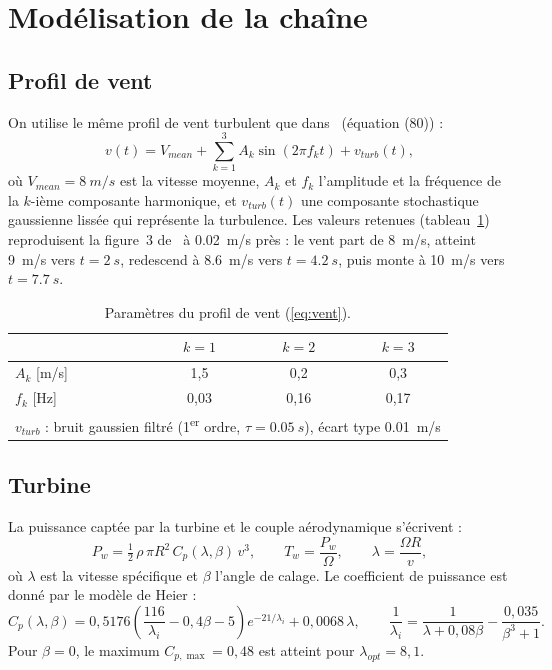 \documentclass[11pt,a4paper]{article}
\theoremstyle{remark}
\begin{document}
\section{Modélisation de la chaîne}

\subsection{Profil de vent}
On utilise le même profil de vent turbulent que dans~\cite{regani} (équation (80)) :
\begin{equation}
  v(t) = V_{mean} + \sum_{k=1}^{3} A_k \sin(2\pi f_k t) + v_{turb}(t),
  \label{eq:vent}
\end{equation}
où $V_{mean}=\SI{8}{m/s}$ est la vitesse moyenne, $A_k$ et $f_k$ l'amplitude et la fréquence de la
$k$-ième composante harmonique, et $v_{turb}(t)$ une composante stochastique gaussienne lissée qui
représente la turbulence. Les valeurs retenues (tableau~\ref{tab:vent}) reproduisent la figure~3
de~\cite{regani} à \SI{0,02}{m/s} près : le vent part de \SI{8}{m/s}, atteint \SI{9}{m/s} vers
$t=\SI{2}{s}$, redescend à \SI{8,6}{m/s} vers $t=\SI{4,2}{s}$, puis monte à \SI{10}{m/s} vers
$t=\SI{7,7}{s}$.

\begin{table}[h]
\centering
\caption{Paramètres du profil de vent (\ref{eq:vent}).}
\label{tab:vent}
\begin{tabular}{lccc}
\toprule
& $k=1$ & $k=2$ & $k=3$\\
\midrule
$A_k$ [\si{m/s}] & 1,5 & 0,2 & 0,3\\
$f_k$ [\si{Hz}] & 0,03 & 0,16 & 0,17\\
\midrule
\multicolumn{4}{l}{$v_{turb}$ : bruit gaussien filtré (1\textsuperscript{er} ordre, $\tau=\SI{0,05}{s}$),
écart type \SI{0,01}{m/s}}\\
\bottomrule
\end{tabular}
\end{table}

\subsection{Turbine}
La puissance captée par la turbine et le couple aérodynamique s'écrivent :
\begin{equation}
  P_w = \tfrac12\,\rho\,\pi R^2\,C_p(\lambda,\beta)\,v^3, \qquad
  T_w = \frac{P_w}{\Omega}, \qquad
  \lambda = \frac{\Omega R}{v},
  \label{eq:turbine}
\end{equation}
où $\lambda$ est la vitesse spécifique et $\beta$ l'angle de calage. Le coefficient de puissance
est donné par le modèle de Heier :
\begin{equation}
  C_p(\lambda,\beta) = 0{,}5176\left(\frac{116}{\lambda_i} - 0{,}4\beta - 5\right)e^{-21/\lambda_i}
  + 0{,}0068\,\lambda,
  \qquad
  \frac{1}{\lambda_i} = \frac{1}{\lambda+0{,}08\beta} - \frac{0{,}035}{\beta^3+1}.
\end{equation}
Pour $\beta=0$, le maximum $C_{p,\max}=0{,}48$ est atteint pour $\lambda_{opt}=8{,}1$.
\end{document}
